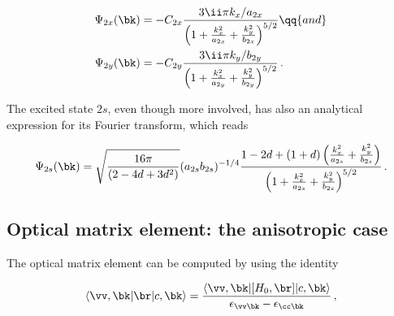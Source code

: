 \begin{equation}
    \label{eq:2x_2y_wavefunctions_momentum}
    \begin{aligned}
        \Psi_{2x} (\bk) &= - C_{2x} \frac{3 \ii \pi k_x/a_{2x}}{\left(1 + \frac{k_x^2}{a_{2x}} + \frac{k_y^2}{b_{2x}}\right)^{5/2}} \qq{and} \\
        \Psi_{2y} (\bk) &= - C_{2y} \frac{3 \ii \pi k_y/b_{2y}}{\left(1 + \frac{k_x^2}{a_{2y}} + \frac{k_y^2}{b_{2y}}\right)^{5/2}} \,.
    \end{aligned}
\end{equation}

The excited state $2s$, even though more involved, has also an analytical expression for its Fourier transform, which reads

\begin{equation}
    \Psi_{2s} (\bk) = \sqrt{\frac{16 \pi}{(2 - 4d + 3d^2)}} (a_{2s} b_{2s})^{-1/4} \frac{1-2d + (1 + d) \left(\frac{k_x^2}{a_{2s}} + \frac{k_y^2}{b_{2s}}\right)}{\left(1 + \frac{k_x^2}{a_{2s}} + \frac{k_y^2}{b_{2s}}\right)^{5/2}} \,.
\end{equation}

\subsection{Optical matrix element: the anisotropic case}
\label{subsec:optical_matrix_element_anisotropic_case}

The optical matrix element can be computed by using the identity

\begin{equation}
    \label{eq:optical_matrix_element}
    \langle \vv ,\bk|\br|c,\bk\rangle=\frac{\langle \vv ,\bk|[H_0,\br]|c,\bk\rangle}{\epsilon_{\vv \bk}-\epsilon_{\cc \bk}}\,,
\end{equation}

